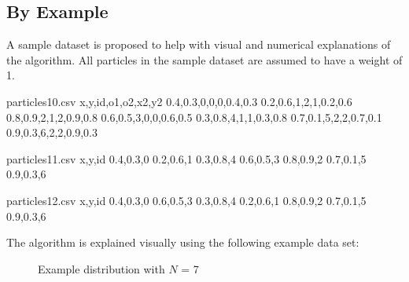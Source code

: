 \documentclass[]{article}
\begin{document}
\subsection{By Example}

A sample dataset is proposed to help with visual and numerical explanations of the algorithm. All particles in the sample dataset are assumed to have a weight of 1.

\begin{filecontents*}{particles10.csv}
	x,y,id,o1,o2,x2,y2
	0.4,0.3,0,0,0,0.4,0.3
	0.2,0.6,1,2,1,0.2,0.6
	0.8,0.9,2,1,2,0.9,0.8
	0.6,0.5,3,0,0,0.6,0.5
	0.3,0.8,4,1,1,0.3,0.8
	0.7,0.1,5,2,2,0.7,0.1
	0.9,0.3,6,2,2,0.9,0.3
\end{filecontents*}

\begin{filecontents*}{particles11.csv}
	x,y,id
	0.4,0.3,0
	0.2,0.6,1
	0.3,0.8,4
	0.6,0.5,3
	0.8,0.9,2
	0.7,0.1,5
	0.9,0.3,6
\end{filecontents*}


\begin{filecontents*}{particles12.csv}
	x,y,id
	0.4,0.3,0
	0.6,0.5,3
	0.3,0.8,4
	0.2,0.6,1
	0.8,0.9,2
	0.7,0.1,5
	0.9,0.3,6
\end{filecontents*}

The algorithm is explained visually using the following example data set:

\begin{figure}[H]
	\begin{center}
		\begin{minipage}[c]{0.2\linewidth}
		\end{minipage}
		\begin{minipage}[c]{0.7\linewidth}
		\end{minipage}
	\end{center}
	\caption{Example distribution with $N$ = 7}
\end{figure}
\end{document}

